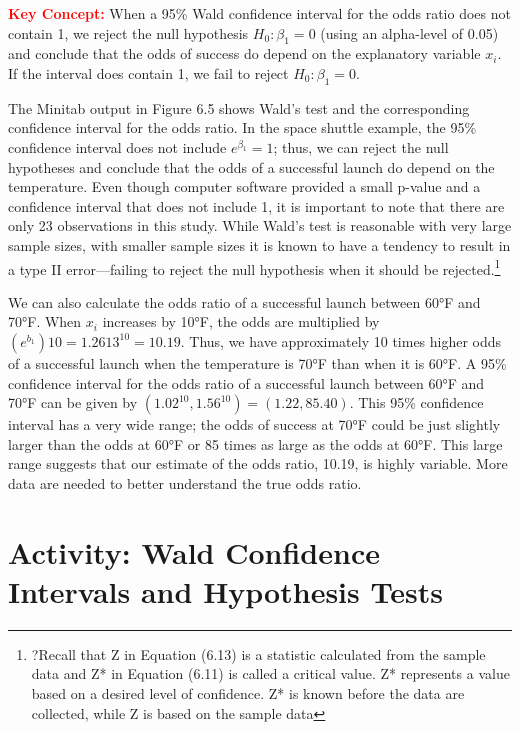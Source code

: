 \documentclass[
]{report}
\begin{document}
\Large

\textbf{\textcolor{red}{Key Concept:}}
\color{red}
When a 95\% Wald confidence interval for the odds ratio does not contain 1, we reject the null hypothesis \(H_0: \beta_1 = 0\) (using an alpha-level of 0.05) and conclude that the odds of success do depend on the explanatory variable \(x_i\). If the interval does contain 1, we fail to reject \(H_0: \beta_1 = 0\).
\color{black}
\normalsize

The Minitab output in Figure 6.5 shows Wald's test and the corresponding confidence interval for the
odds ratio. In the space shuttle example, the 95\% confidence interval does not include \(e^{\beta_1} = 1\); thus, we can
reject the null hypotheses and conclude that the odds of a successful launch do depend on the temperature.
Even though computer software provided a small p-value and a confidence interval that does not include 1, it
is important to note that there are only 23 observations in this study. While Wald's test is reasonable with very
large sample sizes, with smaller sample sizes it is known to have a tendency to result in a type II error---failing
to reject the null hypothesis when it should be rejected.\footnote{?Recall that Z in Equation (6.13) is a statistic calculated from the sample data and Z* in Equation (6.11) is called a critical value. Z* represents a value based on a desired level of confidence. Z* is known before the data are collected, while Z is based on the sample data}

We can also calculate the odds ratio of a successful launch between 60°F and 70°F. When \(x_i\)
increases by 10°F, the odds are multiplied by \((e^{b_1})10 = 1.2613^{10} = 10.19\). Thus, we have approximately
10 times higher odds of a successful launch when the temperature is 70°F than when it is 60°F. A 95\%
confidence interval for the odds ratio of a successful launch between 60°F and 70°F can be given by
\((1.02^10, 1.56^10) = (1.22, 85.40)\). This 95\% confidence interval has a very wide range; the odds of success
at 70°F could be just slightly larger than the odds at 60°F or 85 times as large as the odds at 60°F. This
large range suggests that our estimate of the odds ratio, 10.19, is highly variable. More data are needed to
better understand the true odds ratio.

\hypertarget{activity-wald-confidence-intervals-and-hypothesis-tests}{%
\section*{Activity: Wald Confidence Intervals and Hypothesis Tests}\label{activity-wald-confidence-intervals-and-hypothesis-tests}}
\end{document}
